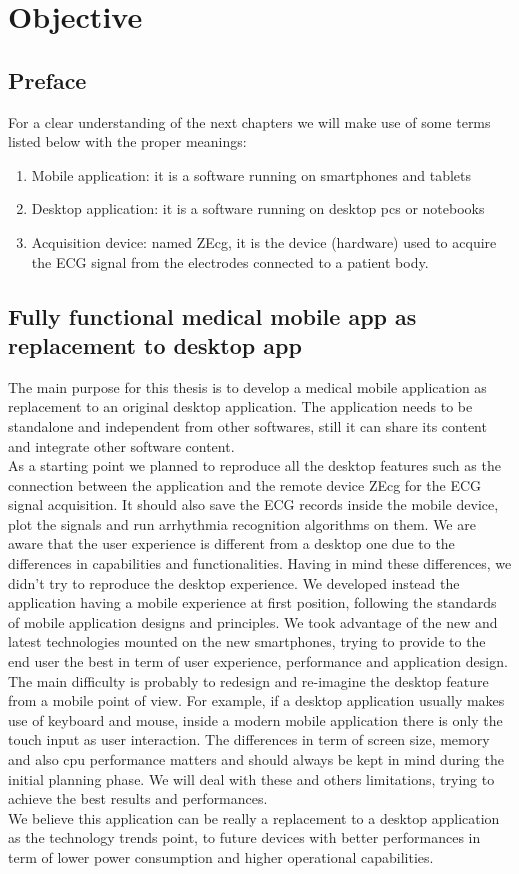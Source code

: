 \chapter{Objective}
\label{Chapter4} 

\section{Preface}
For a clear understanding of the next chapters we will make use of some terms listed below with the proper meanings:
\begin{enumerate}
	\item Mobile application: it is a software running on smartphones and tablets
	\item Desktop application: it is a software running on desktop pcs or notebooks
	\item Acquisition device: named ZEcg, it is the device (hardware) used to acquire the ECG signal from the electrodes connected to a patient body.
\end{enumerate}

\section{Fully functional medical mobile app as replacement to desktop app}
The main purpose for this thesis is to develop a medical  mobile application as replacement to an original desktop application. The application needs to be standalone and independent from other softwares, still it can share its content and integrate other software content.\\
As a starting point we planned to reproduce all the desktop features such as the connection between the application and the remote device ZEcg for the ECG signal acquisition. It should also save the ECG records inside the mobile device, plot the signals and run arrhythmia recognition algorithms on them.  We are aware that the user experience is different from a desktop one due to the differences in capabilities and functionalities. Having in mind these differences, we didn’t try to reproduce the desktop experience. We developed instead the application having a mobile experience at first position, following the standards of mobile application designs and principles. We took advantage of the new and latest technologies mounted on the new smartphones, trying to provide to the end user the best in term of user experience, performance and application design. The main difficulty is probably to redesign and re-imagine the desktop feature from a mobile point of view. For example, if a desktop application usually makes use of keyboard and mouse, inside a modern mobile application there is only the touch input as user interaction. The differences in term of screen size, memory and also cpu performance matters and should always be kept in mind during the initial planning phase. We will deal with these and others limitations, trying to achieve the best results and performances. \\
We believe this application can be really a replacement to a desktop application as the technology trends point, to future devices with better performances in term of lower power consumption and higher operational capabilities.\cite{ref2}


